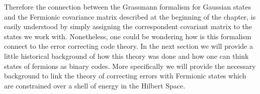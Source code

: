 \newline
Therefore the connection between the Grassmann formalism for Gaussian states and the Fermionic covariance matrix described at the beginning of the chapter, is easily understood by simply assigning the correspondent covariant matrix to the states we work with. Nonetheless, one could be wondering how is this formalism connect to the error correcting code theory. In the next section we will provide a little historical background of how this theory was done and how one can think states of fermions as binary codes. More specifically we will provide the necessary background to link the theory of correcting errors with Fermionic states which are constrained over a shell of energy in the Hilbert Space.



